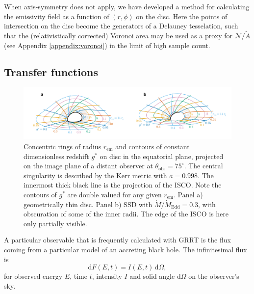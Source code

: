 \documentclass[fleqn,usenatbib]{mnras}
\renewcommand{\d}{\text{d}}
\begin{document}
When axis-symmetry does not apply, we have developed a method for calculating the emissivity field as a function of $(r, \phi)$ on the disc. Here the points of intersection on the disc become the generators of a Delauney tesselation, such that the (relativistically corrected) Voronoi area may be used as a proxy for $\mathcal{N} /\tilde{A}$ (see Appendix \ref{appendix:voronoi}) in the limit of high sample count.

\subsection{Transfer functions}
\label{sec:transfer-functions}

\begin{figure}
    \centering
    \includegraphics[width=0.95\linewidth]{figures/transfer-function.parameterization.pdf}
    \caption{Concentric rings of radius $r_\text{em}$ and contours of constant dimensionless redshift $g^\ast$ on disc in the equatorial plane, projected on the image plane of a distant observer at $\theta_\text{obs} = 75^\circ$. The central singularity is described by the Kerr metric with $a = 0.998$. The innermost thick black line is the projection of the ISCO. Note the contours of $g^\ast$ are double valued for any given $r_\text{em}$. Panel a) geometrically thin disc. Panel b) SSD with $\dot{M} / \dot{M}_\text{Edd} = 0.3$, with obscuration of some of the inner radii. The edge of the ISCO is here only partially visible.}
    \label{fig:transfer-parameterisation}
\end{figure}

A particular observable that is frequently calculated with GRRT is the flux coming from a particular model of an accreting black hole. The infinitesimal flux is
\begin{equation}
\label{eq:infinitesimal-flux}
\d F(E, t) = I\left(E, t\right)\, \d \Omega,
\end{equation}
for observed energy $E$, time $t$, intensity $I$ and solid angle $\d \Omega$ on the observer's sky.
\end{document}
